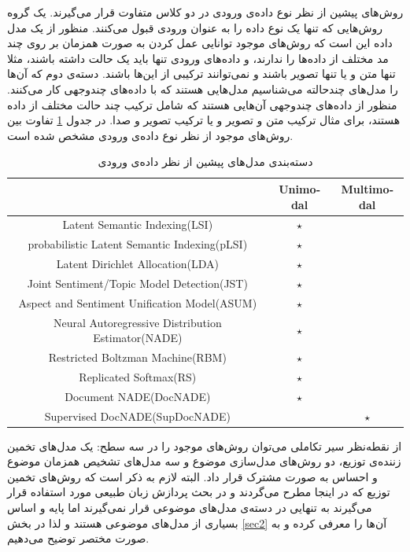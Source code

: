 روش‌های پیشین از نظر نوع داده‌ی ورودی در دو کلاس متفاوت قرار می‌‌گیرند. یک گروه روش‌هایی که تنها یک نوع داده را به عنوان ورودی قبول می‌‌کنند. منظور از یک مدل داده این است که روش‌های موجود توانایی عمل کردن به صورت همزمان بر روی چند مد مختلف از داده‌ها را ندارند، و داده‌های ورودی تنها باید یک حالت داشته باشند، مثلا تنها متن و یا تنها تصویر باشند و نمی‌‌توانند ترکیبی‌ از این‌ها باشند. دسته‌ی دوم که آن‌ها را مدل‌های چندحالته می‌‌شناسیم مدل‌هایی هستند که با داده‌های چندوجهی کار می‌‌کنند. منظور از داده‌های چندوجهی آن‌هایی هستند که شامل ترکیب چند حالت مختلف از داده هستند، برای مثال ترکیب متن و تصویر و یا ترکیب تصویر و صدا. در جدول
\ref{tabel3-3}
تفاوت بین روش‌های موجود از نظر نوع داد‌ه‌ی ورودی مشخص شده است.
\begin{table}[!b]
	\centering
	\begin{latin}
		\begin{tabular}{|c|c|c|}
			\hline
			                            & Unimodal & Multimodal \\ \hline
			          Latent Semantic Indexing(LSI)            & $\star$  &  \\ \hline
			   probabilistic Latent Semantic Indexing(pLSI)    & $\star$  &  \\ \hline
			         Latent Dirichlet Allocation(LDA)          & $\star$  &  \\ \hline
			    Joint Sentiment/Topic Model Detection(JST)     & $\star$  &  \\ \hline
			   Aspect and Sentiment Unification Model(ASUM)    & $\star$  &  \\ \hline
			Neural Autoregressive Distribution Estimator(NADE) & $\star$  &  \\ \hline
			         Restricted Boltzman Machine(RBM)          & $\star$  &  \\ \hline
			              Replicated Softmax(RS)               & $\star$  &  \\ \hline
			              Document NADE(DocNADE)               & $\star$  &  \\ \hline
			          Supervised DocNADE(SupDocNADE)           &          &  $\star$   \\ \hline
		\end{tabular}
	\end{latin}
	\caption{دسته‌بندی مدل‌های پیشین از نظر داده‌ی ورودی}
	\label{tabel3-3}
\end{table}

از نقطه‌نظر سیر تکاملی می‌‌توان روش‌های موجود را در سه‌ سطح: یک مدل‌های تخمین زننده‌ی توزیع، دو روش‌های مدل‌سازی موضوع و سه مدل‌های تشخیص همزمان موضوع و احساس به صورت مشترک قرار داد. البته لازم به ذکر است که روش‌های تخمین توزیع که در اینجا مطرح می‌‌گردند و در بحث پردازش زبان طبیعی مورد استفاده قرار می‌‌گیرند به تنهایی در دسته‌ی مدل‌های موضوعی قرار نمی‌‌گیرند اما پایه و اساس بسیاری از مدل‌های موضوعی هستند و لذا در بخش
\ref{sec2}
آن‌ها را معرفی‌ کرده و به صورت مختصر توضیح می‌‌دهیم.



